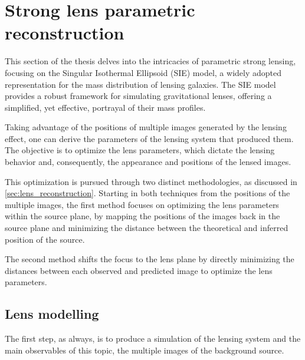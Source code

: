 \section{Strong lens parametric reconstruction}
\label{sec:strong_lens}

This section of the thesis delves into the intricacies of parametric strong lensing, focusing on the Singular Isothermal Ellipsoid (SIE) model, a widely adopted representation for the mass distribution of lensing galaxies. The SIE model provides a robust framework for simulating gravitational lenses, offering a simplified, yet effective, portrayal of their mass profiles.

Taking advantage of the positions of multiple images generated by the lensing effect, one can derive the parameters of the lensing system that produced them. The objective is to optimize the lens parameters, which dictate the lensing behavior and, consequently, the appearance and positions of the lensed images.

This optimization is pursued through two distinct methodologies, as discussed in \cref{sec:lens_reconstruction}. Starting in both techniques from the positions of the multiple images, the first method focuses on optimizing the lens parameters within the source plane, by mapping the positions of the images back in the source plane and minimizing the distance between the theoretical and inferred position of the source.

The second method shifts the focus to the lens plane by directly minimizing the distances between each observed and predicted image to optimize the lens parameters.

\subsection{Lens modelling}
\label{subsec:lens_modelling}
The first step, as always, is to produce a simulation of the lensing system and the main observables of this topic, the multiple images of the background source.

